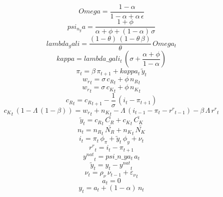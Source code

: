 \documentclass[10pt,a4paper]{article}
\begin{document}
\footnotesize
\begin{dmath*}
Omega = \frac{1-{\alpha}}{1-{\alpha}+{\alpha}\, {\epsilon}}
\end{dmath*}
\begin{dmath*}
psi_n_ya = \frac{1+{\phi}}{{\alpha}+{\phi}+\left(1-{\alpha}\right)\, {\sigma}}
\end{dmath*}
\begin{dmath*}
lambda_gali = \frac{\left(1-{\theta}\right)\, \left(1-{\theta}\, {\beta}\right)}{{\theta}}\, Omega_{t}
\end{dmath*}
\begin{dmath*}
kappa = lambda\_gali_{t}\, \left({\sigma}+\frac{{\alpha}+{\phi}}{1-{\alpha}}\right)
\end{dmath*}
\begin{dmath}
{\pi}_{t}={\beta}\, {\pi}_{t+1}+kappa_{t}\, {\tilde y}_{t}
\end{dmath}
\begin{dmath}
{w_r}_{t}={\sigma}\, {c_R}_{t}+{\phi}\, {n_R}_{t}
\end{dmath}
\begin{dmath}
{w_r}_{t}={\sigma}\, {c_K}_{t}+{\phi}\, {n_K}_{t}
\end{dmath}
\begin{dmath}
{c_R}_{t}={c_R}_{t+1}-\frac{1}{{\sigma}}\, \left({i}_{t}-{\pi}_{t+1}\right)
\end{dmath}
\begin{dmath}
{c_K}_{t}\, \left(1-{\Lambda}\, \left(1-{\beta}\right)\right)={w_r}_{t}+{n_K}_{t}-{\Lambda}\, \left({i}_{t-1}-{\pi}_{t}-{r^r}_{t-1}\right)-{\beta}\, {\Lambda}\, {r^r}_{t}
\end{dmath}
\begin{dmath}
{\tilde y}_{t}={c_R}_{t}\, \bar{C_R}+{c_K}_{t}\, \bar{C_K}
\end{dmath}
\begin{dmath}
{n}_{t}={n_R}_{t}\, \bar{N_R}+{n_K}_{t}\, \bar{N_K}
\end{dmath}
\begin{dmath}
{i}_{t}={\pi}_{t}\, {\phi_{\pi}}+{\tilde y}_{t}\, {\phi_{y}}+{\nu}_{t}
\end{dmath}
\begin{dmath}
{r^r}_{t}={i}_{t}-{\pi}_{t+1}
\end{dmath}
\begin{dmath}
{y^{nat}}_{t}=psi\_n\_ya_{t}\, {a}_{t}
\end{dmath}
\begin{dmath}
{\tilde y}_{t}={y}_{t}-{y^{nat}}_{t}
\end{dmath}
\begin{dmath}
{\nu}_{t}={\rho_{\nu}}\, {\nu}_{t-1}+{\varepsilon_\nu}_{t}
\end{dmath}
\begin{dmath}
{a}_{t}=0
\end{dmath}
\begin{dmath}
{y}_{t}={a}_{t}+\left(1-{\alpha}\right)\, {n}_{t}
\end{dmath}
\end{document}
